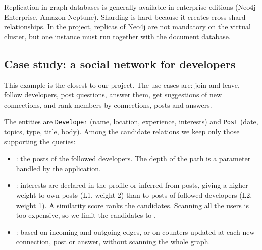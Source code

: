 \begin{remark}
Replication in graph databases is generally available in enterprise editions (Neo4j Enterprise, Amazon Neptune). Sharding is hard because it creates cross-shard relationships. In the project, replicas of Neo4j are not mandatory on the virtual cluster, but one instance must run together with the document database.
\end{remark}

\subsection{Case study: a social network for developers}\label{sec:social-network}
This example is the closest to our project. The use cases are: join and leave, follow developers, post questions, answer them, get suggestions of new connections, and rank members by connections, posts and answers.

The entities are \texttt{Developer} (name, location, experience, interests) and \texttt{Post} (date, topics, type, title, body). Among the candidate relations we keep only those supporting the queries:
\begin{center}
\end{center}

\begin{itemize}
  \item {}: the posts of the followed developers. The depth of the path is a parameter handled by the application.
  \item {}: interests are declared in the profile or inferred from posts, giving a higher weight to own posts (L1, weight 2) than to posts of followed developers (L2, weight 1). A similarity score ranks the candidates. Scanning all the users is too expensive, so we limit the candidates to .
  \item {}: based on incoming and outgoing edges, or on counters updated at each new connection, post or answer, without scanning the whole graph.
\end{itemize}
